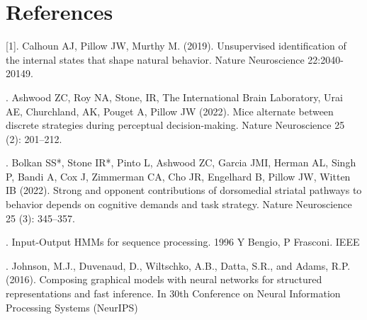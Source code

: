 \documentclass{article}
\begin{document}
\section*{References} 

[1]. Calhoun AJ, Pillow JW,  Murthy M. (2019). Unsupervised identification of the internal states that shape natural behavior. Nature Neuroscience 22:2040-20149.

\bigskip
\noindent
[2]. Ashwood ZC, Roy NA, Stone, IR, The International Brain Laboratory, Urai AE, Churchland, AK, Pouget A, Pillow JW (2022).
Mice alternate between discrete strategies during perceptual decision-making. Nature Neuroscience 25 (2): 201–212.

\bigskip
\noindent
[3]. Bolkan SS*, Stone IR*, Pinto L, Ashwood ZC, Garcia JMI, Herman AL, Singh P, Bandi A, Cox J, Zimmerman CA, Cho JR, Engelhard B, Pillow JW, Witten IB (2022). Strong and opponent contributions of dorsomedial striatal pathways to behavior depends on cognitive demands and task strategy. Nature Neuroscience 25 (3): 345–357.

\bigskip
\noindent
[4]. Input-Output HMMs for sequence processing. 1996 Y Bengio, P Frasconi. IEEE

\bigskip
\noindent
[5]. Johnson, M.J., Duvenaud, D., Wiltschko, A.B., Datta, S.R., and Adams, R.P. (2016). Composing graphical models with neural networks for structured representations and fast inference. In 30th Conference on Neural Information Processing Systems (NeurIPS)
\end{document}
